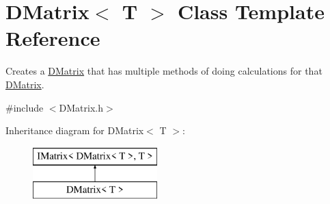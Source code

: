 \hypertarget{class_d_matrix}{}\section{D\+Matrix$<$ T $>$ Class Template Reference}
\label{class_d_matrix}


Creates a \mbox{\hyperlink{class_d_matrix}{D\+Matrix}} that has multiple methods of doing calculations for that \mbox{\hyperlink{class_d_matrix}{D\+Matrix}}.  




{\ttfamily \#include $<$D\+Matrix.\+h$>$}

Inheritance diagram for D\+Matrix$<$ T $>$\+:\begin{figure}[H]
\begin{center}
\leavevmode
\includegraphics[height=2.000000cm]{class_d_matrix}
\end{center}
\end{figure}

